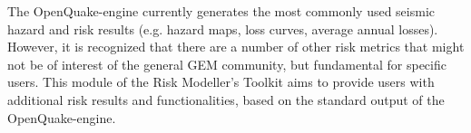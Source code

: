 The OpenQuake-engine currently generates the most commonly used seismic hazard and risk results (e.g. hazard maps, loss curves, average annual losses). However, it is recognized that there are a number of other risk metrics that might not be of interest of the general GEM community, but fundamental for specific users. This module of the Risk Modeller's Toolkit aims to provide users with additional risk results and functionalities, based on the standard output of the OpenQuake-engine.